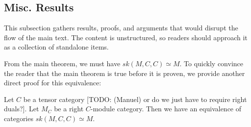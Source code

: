 

\subsection{Misc. Results}
\noindent This subsection gathers results, proofs, and arguments that would
disrupt the flow of the main text. The content is unstructured, so readers
should approach it as a collection of standalone items.

\noindent From the main theorem, we must have $sk(M,C,C) \simeq M$. To quickly
convince the reader that the main theorem is true before it is proven, we
provide another direct proof for this equivalence:

\begin{proposition} \label{proposition/degenerated-main-theorem}

  \noindent Let $C$ be a tensor category [TODO: (Manuel) or do we just have to require right duals?]. Let $M_{C}$ be a right $C$-module
  category. \quad Then we have an equivalence of categories
  $sk(M,C,C) \simeq M$.
\end{proposition}

